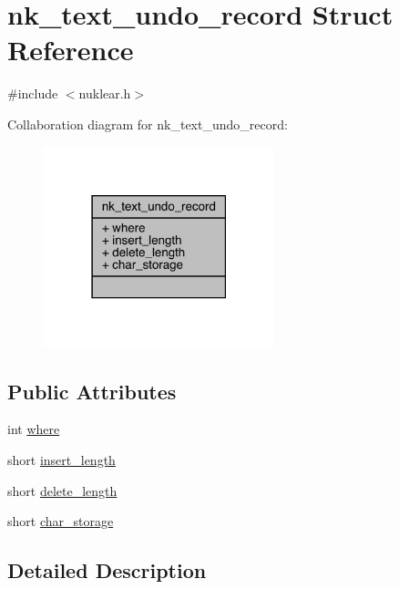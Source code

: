 \hypertarget{structnk__text__undo__record}{}\section{nk\+\_\+text\+\_\+undo\+\_\+record Struct Reference}
\label{structnk__text__undo__record}


{\ttfamily \#include $<$nuklear.\+h$>$}



Collaboration diagram for nk\+\_\+text\+\_\+undo\+\_\+record\+:
\nopagebreak
\begin{figure}[H]
\begin{center}
\leavevmode
\includegraphics[width=190pt]{structnk__text__undo__record__coll__graph}
\end{center}
\end{figure}
\subsection*{Public Attributes}
\begin{DoxyCompactItemize}
\item 
int \mbox{\hyperlink{structnk__text__undo__record_a2c32ddd92906ecaca05e6d6a1e6de551}{where}}
\item 
short \mbox{\hyperlink{structnk__text__undo__record_ae7f5973ad63b09bf0be082779de9b61e}{insert\+\_\+length}}
\item 
short \mbox{\hyperlink{structnk__text__undo__record_a449376b54622b187e084cc30b7f0f150}{delete\+\_\+length}}
\item 
short \mbox{\hyperlink{structnk__text__undo__record_ad5cd5f38387f14f8f34cf00ed861f70d}{char\+\_\+storage}}
\end{DoxyCompactItemize}


\subsection{Detailed Description}


